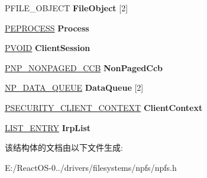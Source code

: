 \begin{DoxyCompactItemize}
P\+F\+I\+L\+E\+\_\+\+O\+B\+J\+E\+CT {\bfseries File\+Object} \mbox{[}2\mbox{]}
\item 
\mbox{\label{struct___n_p___c_c_b_aa25ff4a92877f3c64145ea1b42ad49d5}} 
\hyperlink{struct___e_p_r_o_c_e_s_s}{P\+E\+P\+R\+O\+C\+E\+SS} {\bfseries Process}
\item 
\mbox{\label{struct___n_p___c_c_b_a05e0d23315a73ca633a15748b1a9baef}} 
\hyperlink{interfacevoid}{P\+V\+O\+ID} {\bfseries Client\+Session}
\item 
\mbox{\label{struct___n_p___c_c_b_a0146ba0ce8195002786c6e9270df535b}} 
\hyperlink{struct___n_p___n_o_n_p_a_g_e_d___c_c_b}{P\+N\+P\+\_\+\+N\+O\+N\+P\+A\+G\+E\+D\+\_\+\+C\+CB} {\bfseries Non\+Paged\+Ccb}
\item 
\mbox{\label{struct___n_p___c_c_b_a5d42b8ca16e8244162246c3b35c0b3a9}} 
\hyperlink{struct___n_p___d_a_t_a___q_u_e_u_e}{N\+P\+\_\+\+D\+A\+T\+A\+\_\+\+Q\+U\+E\+UE} {\bfseries Data\+Queue} \mbox{[}2\mbox{]}
\item 
\mbox{\label{struct___n_p___c_c_b_a0c01bd97f3f31c048dfeb2d4f5cd474c}} 
\hyperlink{struct___s_e_c_u_r_i_t_y___c_l_i_e_n_t___c_o_n_t_e_x_t}{P\+S\+E\+C\+U\+R\+I\+T\+Y\+\_\+\+C\+L\+I\+E\+N\+T\+\_\+\+C\+O\+N\+T\+E\+XT} {\bfseries Client\+Context}
\item 
\mbox{\label{struct___n_p___c_c_b_a8e3f1ba9f8ea2885a40e990f46e08295}} 
\hyperlink{struct___l_i_s_t___e_n_t_r_y}{L\+I\+S\+T\+\_\+\+E\+N\+T\+RY} {\bfseries Irp\+List}
\end{DoxyCompactItemize}


该结构体的文档由以下文件生成\+:\begin{DoxyCompactItemize}
\item 
E\+:/\+React\+O\+S-\/0../drivers/filesystems/npfs/npfs.\+h\end{DoxyCompactItemize}
